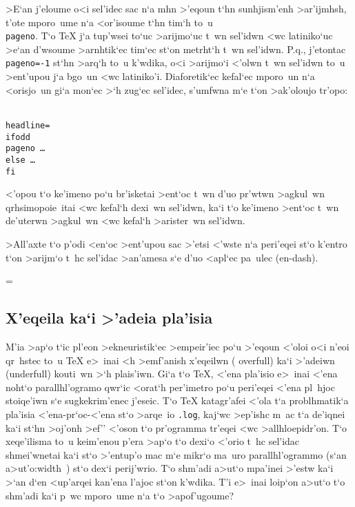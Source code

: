 >E`an j'eloume o<i sel'idec sac n`a mhn >'eqoun t`hn sunhjism'enh
>ar'ijmhsh, t'ote mporo~ume n`a <or'isoume t`hn tim`h to~u {\tt
\\pageno}. T`o {\rm \TeX} j`a tup'wsei to`uc >arijmo`uc t~wn sel'idwn   
<wc latiniko`uc >e`an d'wsoume >arnhtik`ec tim`ec st`on metrht`h t~wn
sel'idwn.  P.q., j'etontac {\tt \\pageno=-1} st`hn >arq`h to~u k'wdika,
o<i >arijmo`i <'olwn t~wn sel'idwn to~u >ent'upou j`a bgo~un <wc
latiniko'i. Diaforetik`ec kefal`ec mporo~un n`a
<orisjo~un gi`a mon`ec >`h zug`ec sel'idec, s'umfwna m`e t`on >ak'oloujo
tr'opo:  

{\tt
\\headline=\lb\\ifodd \\pageno \lb\dots\rb \\else \lb\dots\rb\\fi\rb}

\noindent
<'opou t`o ke'imeno po`u br'isketai >ent`oc t~wn d'uo pr'wtwn >agkul~wn 
qrhsimopoie~itai <wc kefal`h dexi~wn sel'idwn, ka`i t`o ke'imeno >ent`oc
t~wn de'uterwn >agkul~wn <wc kefal`h >arister~wn sel'idwn.

\exercise >All'axte t`o p'odi <en`oc >ent'upou sac >'etsi <'wste n`a
peri'eqei st`o k'entro t`on >arijm`o t~hc sel'idac >an'amesa s`e d'uo
<apl`ec pa~ulec ({\rm en-dash}).

\headline={\iftitlepage \hfil \global\titlepagefalse
                                      \else \gentleheadline \fi}

\subsection{X'eqeila ka`i >'adeia pla'isia}

\nobreak

M'ia >ap`o t`ic pl'eon >ekneuristik`ec >empeir'iec po`u >'eqoun <'oloi
o<i n'eoi qr~hstec to~u {\rm \TeX} e>~inai <h >emf'anish x'eqeilwn ({\rm
overfull}) ka`i >'adeiwn ({\rm underfull}) {\tengs kouti~wn\/} >`h
{\tengs plais'iwn}.  Gi`a t`o {\rm \TeX}, <'ena pla'isio e>~inai <'ena
noht`o parallhl'ogramo qwr`ic <orat`h per'imetro po`u peri'eqei <'ena pl~hjoc
stoiqe'iwn s`e sugkekrim'enec j'eseic. T`o {\rm \TeX} katagr'afei <'ola
t`a problhmatik`a pla'isia <'ena-pr`oc-<'ena st`o >arqe~io {\tt .log},
kaj`wc >ep'ishc m~ac t`a de'iqnei ka`i st`hn >oj'onh >ef'' <'oson t`o
pr'ogramma tr'eqei <wc >al\-lhlo\-epi\-dr'on. T`o xeqe'ilisma to~u
keim'enou p'era >ap`o t`o dexi`o <'orio t~hc sel'idac shmei'wnetai ka`i
st`o >'entup'o mac m`e mikr`o ma~uro parallhl'ogrammo (s`an
a>ut'o:\NB{}\vrule width \overfullrule $\,$) st`o dex`i perij'wrio.  T`o
shm'adi a>ut`o mpa'inei >'estw ka`i >`an d`en <up'arqei kan'ena l'ajoc
st`on k'wdika.  T'i e>~inai loip`on a>ut`o t`o shm'adi ka`i p~wc
mporo~ume n`a t`o >apof'ugoume?

